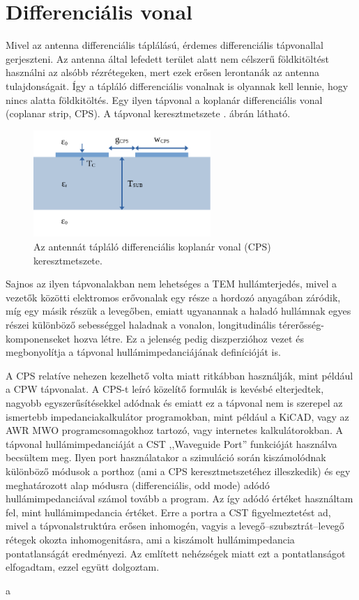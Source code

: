 \section{Differenciális vonal}
Mivel az antenna differenciális táplálású, érdemes differenciális tápvonallal gerjeszteni. Az antenna által lefedett terület alatt nem célszerű földkitöltést használni az alsóbb rézrétegeken, mert ezek erősen lerontanák az antenna tulajdonságait. Így a tápláló differenciális vonalnak is olyannak kell lennie, hogy nincs alatta földkitöltés. Egy ilyen tápvonal a koplanár differenciális vonal (coplanar strip, CPS). A tápvonal keresztmetszete . ábrán látható.
\begin{figure}[h]
	\centering
	\includegraphics[width=0.6\textwidth]{kep/cps.pdf}
	\caption{Az antennát tápláló differenciális koplanár vonal (CPS) keresztmetszete.}
	\label{fig:cps}
\end{figure}
\par Sajnos az ilyen tápvonalakban nem lehetséges a TEM hullámterjedés, mivel a vezetők közötti elektromos erővonalak egy része a hordozó anyagában záródik, míg egy másik részük a levegőben, emiatt ugyanannak a haladó hullámnak egyes részei különböző sebességgel haladnak a vonalon, longitudinális térerősség-komponenseket hozva létre. Ez a jelenség pedig diszperzióhoz vezet és megbonyolítja a tápvonal hullámimpedanciájának definícióját is.
\par A CPS relatíve nehezen kezelhető volta miatt ritkábban használják, mint például a CPW tápvonalat. A CPS-t leíró közelítő formulák is kevésbé elterjedtek, nagyobb egyszerűsítésekkel adódnak és emiatt ez a tápvonal nem is szerepel az ismertebb impedanciakalkulátor programokban, mint például a KiCAD, vagy az AWR MWO programcsomagokhoz tartozó, vagy internetes kalkulátorokban. A tápvonal hullámimpedanciáját a CST ,,Waveguide Port'' funkcióját használva becsültem meg. Ilyen port használatakor a szimuláció során kiszámolódnak különböző módusok a porthoz (ami a CPS keresztmetszetéhez illeszkedik) és egy meghatározott alap módusra (differenciális, odd mode) adódó hullámimpedanciával számol tovább a program. Az így adódó értéket használtam fel, mint hullámimpedancia értéket. Erre a portra a CST figyelmeztetést ad, mivel a tápvonalstruktúra erősen inhomogén, vagyis a levegő--szubsztrát--levegő rétegek okozta inhomogenitásra, ami a kiszámolt hullámimpedancia pontatlanságát eredményezi. Az említett nehézségek miatt ezt a pontatlanságot elfogadtam, ezzel együtt dolgoztam.
\par a
